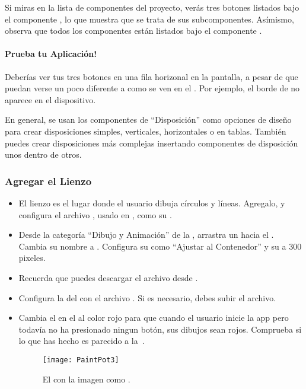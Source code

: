 Si miras en la lista de componentes del proyecto, verás tres botones
listados bajo el componente , lo que
muestra que se trata de sus subcomponentes. Asímismo, observa que
todos los componentes están listados bajo el componente
.

\paragraph{Prueba tu Aplicación!} Deberías ver tus tres botones en una
fila horizonal en la pantalla, a pesar de que puedan verse un poco
diferente a como se ven en el \designer. Por ejemplo, el borde de
 no aparece en el dispositivo.

En general, se usan los componentes de ``Disposición'' como opciones
de diseño para crear disposiciones simples, verticales, horizontales o
en tablas. También puedes crear disposiciones más complejas insertando
componentes de disposición unos dentro de otros.

\subsubsection*{Agregar el Lienzo}

\begin{itemize}

\item El lienzo es el lugar donde el usuario dibuja círculos y
  líneas. Agregalo, y configura el archivo ,
  usado en , como su .

\item Desde la categoría ``Dibujo y Animación'' de la \palette,
  arrastra un  hacia el \viewer. Cambia su nombre a
  . Configura su  como
  ``Ajustar al Contenedor'' y su  a 300 pixeles.

\item Recuerda que puedes descargar el archivo 
  desde .

\item Configura la  del
   con el archivo . Si
  es necesario, debes subir el archivo.

\item Cambia el  en el
   al color rojo para que cuando
  el usuario inicie la app pero todavía no ha presionado ningun botón,
  sus dibujos sean rojos. Comprueba si lo que has hecho es parecido a
  la~.

\begin{figure}[H]
\centering
\texttt{[image: PaintPot3]}
\caption{El  con la imagen
   como .}
\label{fig:PaintPot3}
\end{figure}

\end{itemize}

